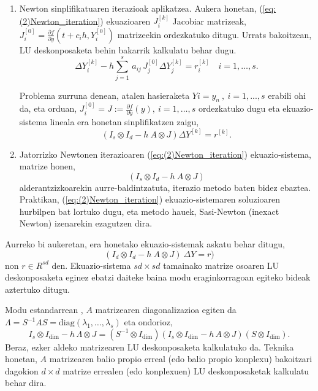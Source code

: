 \begin{enumerate}
\item Newton sinplifikatuaren iterazioak aplikatzea. 
Aukera honetan, (\ref{eq:(2)Newton_iteration}) ekuazioaren $J_i^{[k]}$ Jacobiar matrizeak, $J_i^{[0]}=\frac{\partial f}{\partial y}(t+c_ih, Y_i^{[0]})$ matrizeekin ordezkatuko ditugu. Urrats bakoitzean, LU deskonposaketa behin bakarrik kalkulatu behar dugu.
\begin{equation*}
\Delta Y_{i}^{[k]}  - h \sum_{j=1}^{s}\, a_{ij}\, J_j^{[0]} \Delta Y_{j}^{[k]} = r_i^{[k]} \quad  i=1 ,\ldots, s.
\end{equation*}

Problema zurruna denean, atalen hasieraketa $Y i = y_n \ , \ i = 1, . . . , s$ erabili ohi da, eta orduan, $J_i^{[0]}=J:=\frac{\partial f}{\partial y}(y), \ i=1,\dots,s$ ordezkatuko dugu eta ekuazio-sistema lineala era honetan sinplifikatzen zaigu,
\begin{equation*}
(I_s \otimes I_d - h \ A \otimes J) \Delta Y^{[k]} = r^{[k]}.
\end{equation*} 

\item Jatorrizko Newtonen iterazioaren (\ref{eq:(2)Newton_iteration}) ekuazio-sistema, matrize honen,
\begin{equation}
\label{eq:irksys}
(I_s \otimes I_d - h \ A \otimes J)
\end{equation}
alderantzizkoarekin aurre-baldintzatuta, \cite{Saad2003} iterazio metodo  baten bidez ebaztea. Praktikan, (\ref{eq:(2)Newton_iteration}) ekuazio-sistemaren soluzioaren hurbilpen bat lortuko dugu, eta metodo hauek, Sasi-Newton (inexact Newton) izenarekin ezagutzen dira.    
\end{enumerate}

Aurreko bi aukeretan, era honetako ekuazio-sistemak askatu behar ditugu,
\begin{equation}
(I_d \otimes I_d - h \ A \otimes J) \ \Delta Y = r )
\end{equation} 
non $r \in R^{sd}$ den. Ekuazio-sistema $sd \times sd$ tamainako matrize osoaren LU deskonposaketa eginez ebatzi daiteke baina modu eraginkorragoan egiteko bideak aztertuko ditugu.

Modu estandarrean  \cite{Butcher1976,Liniger1970,Bickart1977} , $A$ matrizearen diagonalizazioa egiten da $\Lambda = S^{-1} A S=\mathrm{diag}(\lambda_1,\ldots,\lambda_s)$ eta ondorioz,
\begin{equation*}
I_s \otimes I_\dim  - h \, \Lambda \otimes J = (S^{-1} \otimes I_\dim) \left( I_s \otimes I_\dim  - h \, A \otimes J\right) (S \otimes I_\dim).
\end{equation*}
Beraz, ezker aldeko matrizearen LU deskonposaketa kalkulatuko da. Teknika honetan, $A$ matrizearen balio propio erreal (edo balio propio konplexu) bakoitzari dagokion $d \times d$ matrize errealen (edo konplexuen) LU deskonposaketak kalkulatu behar dira.

